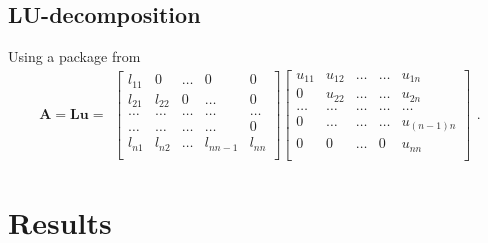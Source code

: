 \documentclass{emulateapj}
\begin{document}
%


\subsection{LU-decomposition}
Using a package from
%
\[ \boldsymbol{A} = \boldsymbol{Lu} =
\begin{array}{c}
\begin{bmatrix}\label{eq:A = Lu}
l_{11}     & 0           & \dots         & 0       & 0 \\
l_{21}     & l_{22}           & 0       & \dots      & 0       \\
\dots       & \dots           & \dots       & \dots      & \dots    \\
\dots       & \dots           & \dots       & \dots      & 0    \\
 l_{n1} &  l_{n2}            & \dots        & l_{nn-1}      & l_{nn}     \\
\end{bmatrix}
\begin{bmatrix}
u_{11}     & u_{12}            & \dots         & \dots       & u_{1n} \\
0     & u_{22}           & \dots       & \dots      & u_{2n}       \\
\dots       & \dots           & \dots       & \dots      & \dots    \\
0       & \dots           & \dots       & \dots      & u_{(n-1)n}    \\
 0 &  0            & \dots        & 0      & u_{nn}     \\
\end{bmatrix}

\end{array}.
\]
%


\section{Results}

\end{document}
